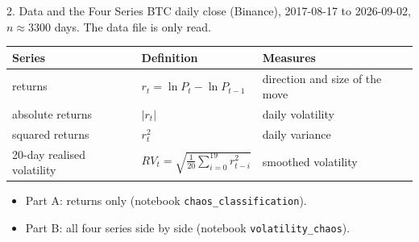 \documentclass[aspectratio=169,10pt]{beamer}
\begin{document}
\begin{frame}{2. Data and the Four Series}
    \centering
    \small
    BTC daily close (Binance), 2017-08-17 to 2026-09-02, $n \approx 3300$ days. The data file is only read.

    \vspace{8pt}
    \begin{tabular}{lll}
        \toprule
        Series & Definition & Measures \\
        \midrule
        returns & $r_t = \ln P_t - \ln P_{t-1}$ & direction and size of the move \\
        absolute returns & $\lvert r_t \rvert$ & daily volatility \\
        squared returns & $r_t^2$ & daily variance \\
        20-day realised volatility & $RV_t = \sqrt{\tfrac{1}{20}\sum_{i=0}^{19} r_{t-i}^2}$ & smoothed volatility \\
        \bottomrule
    \end{tabular}

    \vspace{8pt}
    \raggedright
    \begin{itemize}\small
        \item Part A: returns only (notebook \texttt{chaos\_classification}).
        \item Part B: all four series side by side (notebook \texttt{volatility\_chaos}).
    \end{itemize}
\end{frame}
\end{document}
